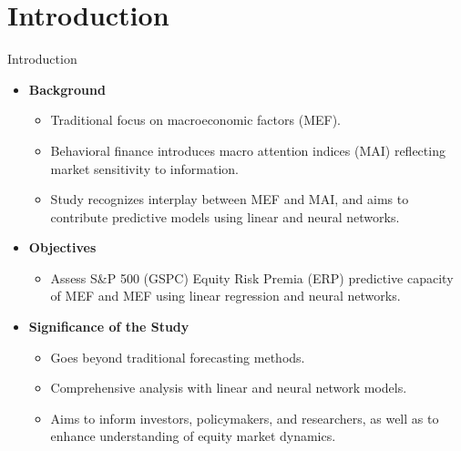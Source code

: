 \documentclass{beamer}
\begin{document}
\section{Introduction}
\begin{frame}{Introduction}
  \begin{itemize}
    \item \textbf{Background}
      \begin{itemize}
        \item Traditional focus on macroeconomic factors (MEF).
        \item Behavioral finance introduces macro attention indices (MAI) reflecting market sensitivity to information.
        \item Study recognizes interplay between MEF and MAI, and aims to contribute predictive models using linear and neural networks.
      \end{itemize}    
    \item \textbf{Objectives}
      \begin{itemize}
        \item Assess S\&P 500 (GSPC) Equity Risk Premia (ERP) predictive capacity of MEF and MEF using linear regression and neural networks.
      \end{itemize}     
    \item \textbf{Significance of the Study}
      \begin{itemize}
        \item Goes beyond traditional forecasting methods.
        \item Comprehensive analysis with linear and neural network models.
        \item Aims to inform investors, policymakers, and researchers, as well as to enhance understanding of equity market dynamics. 
      \end{itemize}
  \end{itemize}
\end{frame}
\end{document}
